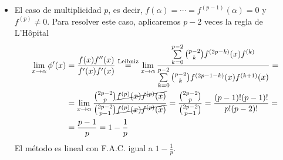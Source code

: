 \begin{itemize}
    \item El caso de multiplicidad $p$, es decir, $f(\alpha) = \cdots = f^{(p-1)}(\alpha) = 0$ y
        $f^{(p)} \neq 0$. Para resolver este caso, aplicaremos $p-2$ veces la regla de L'Hôpital
        \[
            \begin{aligned}
                \lim_{x \to \alpha} \phi^\prime(x) &= \frac{f(x)f^{\prime \prime}(x)}{f^\prime(x) f^\prime(x)}
                \stackrel{\text{Leibniz}}{=} \lim_{x \to \alpha} \frac{\sum\limits^{p-2}_{k = 0} {p-2 \choose k}
                f^{(2p-k)}(x)f^{(k)}}{\sum\limits^{p-2}_{k = 0} {p-2 \choose k }f^{(2p-1-k)}(x)f^{(k+1)}(x)} = \\
                &= \lim_{x \to \alpha} \frac{{2p-2 \choose p} \cancel{f^{(p)}(x)f^{(p)}(x)}}
                {{2p-2 \choose p-1}\cancel{f^{(p)}(x)f^{(p)}(x)}} =
                \frac{ {2p-2 \choose p} }{ {2p-2 \choose p-1} } = \frac{(p-1)!(p-1)!}{p!(p-2)!} = \\
                &= \frac{p-1}{p} = 1 - \frac{1}{p}
            \end{aligned}
        \]
        El método es lineal con F.A.C. igual a $1 - \frac{1}{p}$.
\end{itemize}
